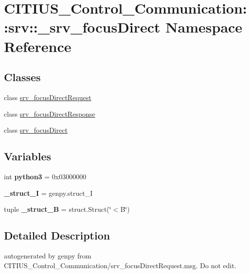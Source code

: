 \hypertarget{namespace_c_i_t_i_u_s___control___communication_1_1srv_1_1__srv__focus_direct}{\section{\-C\-I\-T\-I\-U\-S\-\_\-\-Control\-\_\-\-Communication\-:\-:srv\-:\-:\-\_\-srv\-\_\-focus\-Direct \-Namespace \-Reference}
\label{namespace_c_i_t_i_u_s___control___communication_1_1srv_1_1__srv__focus_direct}
}
\subsection*{\-Classes}
\begin{DoxyCompactItemize}
\item 
class \hyperlink{class_c_i_t_i_u_s___control___communication_1_1srv_1_1__srv__focus_direct_1_1srv__focus_direct_request}{srv\-\_\-focus\-Direct\-Request}
\item 
class \hyperlink{class_c_i_t_i_u_s___control___communication_1_1srv_1_1__srv__focus_direct_1_1srv__focus_direct_response}{srv\-\_\-focus\-Direct\-Response}
\item 
class \hyperlink{class_c_i_t_i_u_s___control___communication_1_1srv_1_1__srv__focus_direct_1_1srv__focus_direct}{srv\-\_\-focus\-Direct}
\end{DoxyCompactItemize}
\subsection*{\-Variables}
\begin{DoxyCompactItemize}
\item 
\hypertarget{namespace_c_i_t_i_u_s___control___communication_1_1srv_1_1__srv__focus_direct_a9afe1a3c39e254f568ff4565205278ca}{int {\bfseries python3} = 0x03000000}\label{namespace_c_i_t_i_u_s___control___communication_1_1srv_1_1__srv__focus_direct_a9afe1a3c39e254f568ff4565205278ca}

\item 
\hypertarget{namespace_c_i_t_i_u_s___control___communication_1_1srv_1_1__srv__focus_direct_a2b026f84f2ea63bc574e48a578a665af}{{\bfseries \-\_\-struct\-\_\-\-I} = genpy.\-struct\-\_\-\-I}\label{namespace_c_i_t_i_u_s___control___communication_1_1srv_1_1__srv__focus_direct_a2b026f84f2ea63bc574e48a578a665af}

\item 
\hypertarget{namespace_c_i_t_i_u_s___control___communication_1_1srv_1_1__srv__focus_direct_ad5f5cd01d80dd3c16b2318e0dca0998e}{tuple {\bfseries \-\_\-struct\-\_\-\-B} = struct.\-Struct(\char`\"{}$<$\-B\char`\"{})}\label{namespace_c_i_t_i_u_s___control___communication_1_1srv_1_1__srv__focus_direct_ad5f5cd01d80dd3c16b2318e0dca0998e}

\end{DoxyCompactItemize}


\subsection{\-Detailed \-Description}
\begin{DoxyVerb}autogenerated by genpy from CITIUS_Control_Communication/srv_focusDirectRequest.msg. Do not edit.\end{DoxyVerb}
 